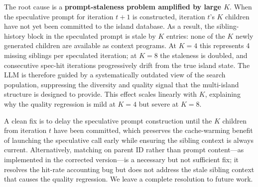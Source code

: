\documentclass{article}
\begin{document}

The root cause is a \textbf{prompt-staleness problem amplified by large
$K$}.
When the speculative prompt for iteration $t{+}1$ is constructed,
iteration $t$'s $K$ children have not yet been committed to the island
database.
As a result, the sibling-history block in the speculated prompt is stale
by $K$ entries: none of the $K$ newly generated children are available
as context programs.
At $K{=}4$ this represents 4 missing siblings per speculated iteration;
at $K{=}8$ the staleness is doubled, and consecutive spec-hit
iterations progressively drift from the true island state.
The LLM is therefore guided by a systematically outdated view of the
search population, suppressing the diversity and quality signal that the
multi-island structure is designed to provide.
This effect scales linearly with $K$, explaining why the quality
regression is mild at $K{=}4$ but severe at $K{=}8$.

A clean fix is to delay the speculative prompt construction until the
$K$ children from iteration $t$ have been committed, which preserves
the cache-warming benefit of launching the speculative call early while
ensuring the sibling context is always current.
Alternatively, matching on parent ID rather than prompt content—as
implemented in the corrected version—is a necessary but not sufficient
fix; it resolves the hit-rate accounting bug but does not address the
stale sibling context that causes the quality regression.
We leave a complete resolution to future work.
\end{document}
